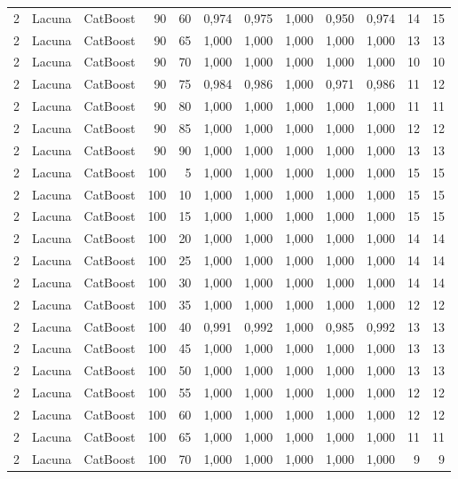 \begin{longtable}{@{}rllrrrrrrrrr@{}}
2 & Lacuna & CatBoost & 90 & 60 & 0,974 & 0,975 & 1,000 & 0,950 & 0,974 & 14 & 15 \\
2 & Lacuna & CatBoost & 90 & 65 & 1,000 & 1,000 & 1,000 & 1,000 & 1,000 & 13 & 13 \\
2 & Lacuna & CatBoost & 90 & 70 & 1,000 & 1,000 & 1,000 & 1,000 & 1,000 & 10 & 10 \\
2 & Lacuna & CatBoost & 90 & 75 & 0,984 & 0,986 & 1,000 & 0,971 & 0,986 & 11 & 12 \\
2 & Lacuna & CatBoost & 90 & 80 & 1,000 & 1,000 & 1,000 & 1,000 & 1,000 & 11 & 11 \\
2 & Lacuna & CatBoost & 90 & 85 & 1,000 & 1,000 & 1,000 & 1,000 & 1,000 & 12 & 12 \\
2 & Lacuna & CatBoost & 90 & 90 & 1,000 & 1,000 & 1,000 & 1,000 & 1,000 & 13 & 13 \\
2 & Lacuna & CatBoost & 100 & 5 & 1,000 & 1,000 & 1,000 & 1,000 & 1,000 & 15 & 15 \\
2 & Lacuna & CatBoost & 100 & 10 & 1,000 & 1,000 & 1,000 & 1,000 & 1,000 & 15 & 15 \\
2 & Lacuna & CatBoost & 100 & 15 & 1,000 & 1,000 & 1,000 & 1,000 & 1,000 & 15 & 15 \\
2 & Lacuna & CatBoost & 100 & 20 & 1,000 & 1,000 & 1,000 & 1,000 & 1,000 & 14 & 14 \\
2 & Lacuna & CatBoost & 100 & 25 & 1,000 & 1,000 & 1,000 & 1,000 & 1,000 & 14 & 14 \\
2 & Lacuna & CatBoost & 100 & 30 & 1,000 & 1,000 & 1,000 & 1,000 & 1,000 & 14 & 14 \\
2 & Lacuna & CatBoost & 100 & 35 & 1,000 & 1,000 & 1,000 & 1,000 & 1,000 & 12 & 12 \\
2 & Lacuna & CatBoost & 100 & 40 & 0,991 & 0,992 & 1,000 & 0,985 & 0,992 & 13 & 13 \\
2 & Lacuna & CatBoost & 100 & 45 & 1,000 & 1,000 & 1,000 & 1,000 & 1,000 & 13 & 13 \\
2 & Lacuna & CatBoost & 100 & 50 & 1,000 & 1,000 & 1,000 & 1,000 & 1,000 & 13 & 13 \\
2 & Lacuna & CatBoost & 100 & 55 & 1,000 & 1,000 & 1,000 & 1,000 & 1,000 & 12 & 12 \\
2 & Lacuna & CatBoost & 100 & 60 & 1,000 & 1,000 & 1,000 & 1,000 & 1,000 & 12 & 12 \\
2 & Lacuna & CatBoost & 100 & 65 & 1,000 & 1,000 & 1,000 & 1,000 & 1,000 & 11 & 11 \\
2 & Lacuna & CatBoost & 100 & 70 & 1,000 & 1,000 & 1,000 & 1,000 & 1,000 & 9 & 9 \\

\end{longtable}
